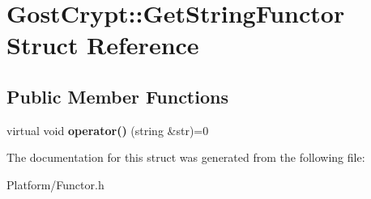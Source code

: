 \hypertarget{struct_gost_crypt_1_1_get_string_functor}{}\section{Gost\+Crypt\+:\+:Get\+String\+Functor Struct Reference}
\label{struct_gost_crypt_1_1_get_string_functor}
\subsection*{Public Member Functions}
\begin{DoxyCompactItemize}
\item 
\mbox{\label{struct_gost_crypt_1_1_get_string_functor_a88645dca8d7e916c8c78d8485a885d1c}} 
virtual void {\bfseries operator()} (string \&str)=0
\end{DoxyCompactItemize}


The documentation for this struct was generated from the following file\+:\begin{DoxyCompactItemize}
\item 
Platform/Functor.\+h\end{DoxyCompactItemize}
